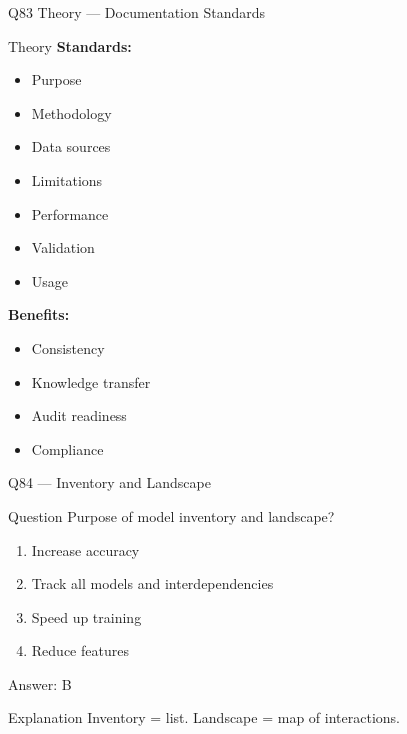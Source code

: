 \documentclass[aspectratio=169,8pt]{beamer}
\begin{document}
	\begin{frame}{Q83 Theory --- Documentation Standards}
		\begin{block}{Theory}
			\textbf{Standards:}
			\begin{itemize}
				\item Purpose
				\item Methodology
				\item Data sources
				\item Limitations
				\item Performance
				\item Validation
				\item Usage
			\end{itemize}
			\textbf{Benefits:}
			\begin{itemize}
				\item Consistency
				\item Knowledge transfer
				\item Audit readiness
				\item Compliance
			\end{itemize}
		\end{block}
	\end{frame}
	
	\begin{frame}{Q84 --- Inventory and Landscape}
		\begin{block}{Question}
			Purpose of model inventory and landscape?
		\end{block}
		\begin{enumerate}[label=\Alph*.]
			\item Increase accuracy
			\item Track all models and interdependencies
			\item Speed up training
			\item Reduce features
		\end{enumerate}
		\begin{exampleblock}{Answer: B}
		\end{exampleblock}
		\begin{block}{Explanation}
			Inventory = list. Landscape = map of interactions.
		\end{block}
	\end{frame}
	
\end{document}
